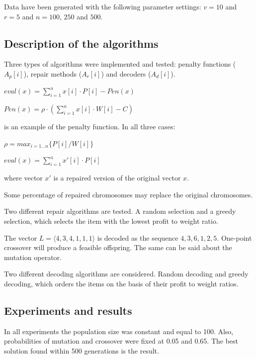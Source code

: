 \documentclass[12pt]{book}
\newcounter{subsubsubsection}[subsubsection]
\begin{document}
Data have been generated with the following parameter settings: $v = 10$ and $r = 5$ and $n = 100$, $250$ and $500$.

\subsection{Description of the algorithms}
Three types of algorithms were implemented and tested: penalty functions ($A_p[i]$), repair methods ($A_r[i]$) and decoders ($A_d[i]$).

\begin{center}
$eval(x) = \sum_{i=1}^{n}x[i] \cdot P[i] - Pen(x)$
\end{center}
\begin{center}
$Pen(x) = \rho \cdot (\sum_{i=1}^{n}x[i] \cdot W[i] - C)$
\end{center}
is an example of the penalty function. In all three cases:
\begin{center}
$\rho = max_{i=1 \dots n}\{P[i]/W[i]\}$
\end{center}

\begin{center}
$eval(x) = \sum_{i=1}^{n}x'[i] \cdot P[i]$
\end{center}
where vector $x'$ is a repaired version of the original vector $x$.

Some percentage of repaired chromosomes may replace the original chromosomes.

Two different repair algorithms are tested. A random selection and a greedy selection, which selects the item with the lowest profit to weight ratio.

The vector $L = \langle 4,3,4,1,1,1 \rangle$ is decoded as the sequence $4, 3, 6, 1, 2, 5$. One-point crossover will produce a feasible offspring. The same can be said about the mutation operator.

Two different decoding algorithms are considered. Random decoding and greedy decoding, which orders the items on the basis of their profit to weight ratios.

\subsection{Experiments and results}
In all experiments the population size was constant and equal to 100. Also, probabilities of mutation and crossover were fixed at 0.05 and 0.65. The best solution found within 500 generations is the result.
\end{document}
